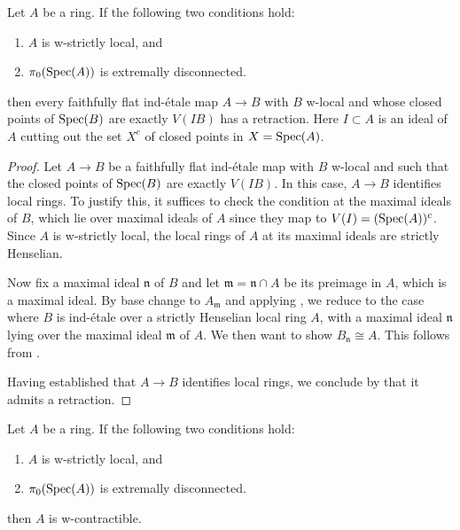\begin{lemma}
  \label{thm:ind-etale-plus-c-has-retraction-if}
  Let $A$ be a ring. If the following two conditions hold:
  \begin{enumerate}
    \item $A$ is w-strictly local, and \label{item:w-strictly-local-ind-etale-plus-c-has-retraction-if}
    \item $\pi_0(\operatorname{Spec} (A))$ is extremally disconnected. \label{item:extremally-disconnected-ind-etale-plus-c-has-retraction-if}
  \end{enumerate}
  then every faithfully flat ind-étale map \(A \to B\) with \(B\) w-local and whose closed points of \(\operatorname{Spec} (B)\) are exactly \(V(IB)\) has a retraction. Here $I \subset A$ is an ideal of $A$ cutting out the set $X^c$ of closed points in $X = \operatorname{Spec} (A)$.
\end{lemma}

\begin{proof}
  Let \(A \to B\) be a faithfully flat ind-étale map with \(B\) w-local and such that the closed points of \(\operatorname{Spec}(B)\) are exactly \(V(IB)\). In this case, \(A \to B\) identifies local rings. To justify this, it suffices to check the condition at the maximal ideals of \(B\), which lie over maximal ideals of \(A\) since they map to \(V(I) = (\operatorname{Spec}(A))^c\). Since \(A\) is w-strictly local, the local rings of \(A\) at its maximal ideals are strictly Henselian.

  Now fix a maximal ideal \(\mathfrak{n}\) of \(B\) and let \(\mathfrak{m} = \mathfrak{n} \cap A\) be its preimage in \(A\), which is a maximal ideal. By base change to \(A_{\mathfrak{m}}\) and applying , we reduce to the case where \(B\) is ind-étale over a strictly Henselian local ring \(A\), with a maximal ideal \(\mathfrak{n}\) lying over the maximal ideal \(\mathfrak{m}\) of \(A\). We then want to show \(B_{\mathfrak{n}} \cong A\). This follows from .

  Having established that \(A \to B\) identifies local rings, we conclude by  that it admits a retraction.
\end{proof}

\begin{proposition} %
  \label{thm:w-contractible-if}
  Let $A$ be a ring. If the following two conditions hold:
  \begin{enumerate}
    \item $A$ is w-strictly local, and
    \item $\pi_0(\operatorname{Spec} (A))$ is extremally disconnected.
  \end{enumerate}
  then $A$ is w-contractible.
\end{proposition}

